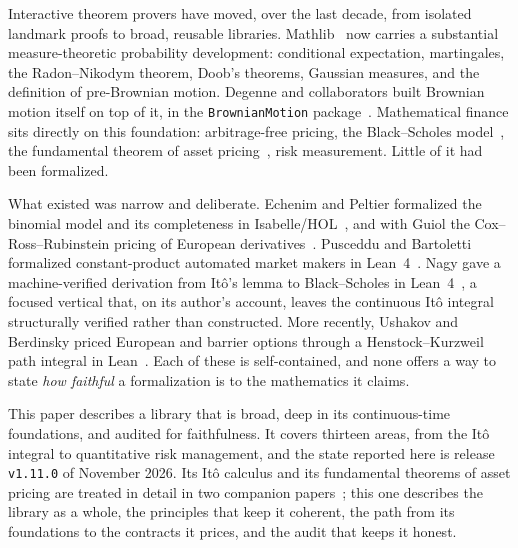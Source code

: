 \documentclass[11pt]{article}
\begin{document}
Interactive theorem provers have moved, over the last decade, from isolated landmark proofs to broad, reusable
libraries. Mathlib~\cite{Mathlib2020} now carries a substantial measure-theoretic probability development:
conditional expectation, martingales, the Radon--Nikodym theorem, Doob's theorems, Gaussian measures, and the
definition of pre-Brownian motion. Degenne and collaborators built Brownian motion itself on top of it,
in the \texttt{BrownianMotion} package~\cite{DegenneEtAl2025,BrownianMotionRepo}. Mathematical finance sits directly on this foundation: arbitrage-free pricing,
the Black--Scholes model~\cite{BlackScholes1973}, the fundamental theorem of asset
pricing~\cite{HarrisonKreps1979}, risk measurement. Little of it had been formalized.

What existed was narrow and deliberate. Echenim and Peltier formalized the binomial model and its completeness
in Isabelle/HOL~\cite{EchenimPeltier2017}, and with Guiol the Cox--Ross--Rubinstein pricing of European
derivatives~\cite{EchenimGuiolPeltier2020}. Pusceddu and Bartoletti formalized constant-product automated market
makers in Lean~4~\cite{PuscedduBartoletti2024}. Nagy gave a machine-verified derivation from It\^o's lemma to
Black--Scholes in Lean~4~\cite{Nagy2026}, a focused vertical that, on its author's account, leaves the continuous
It\^o integral structurally verified rather than constructed. More recently, Ushakov and Berdinsky priced European
and barrier options through a Henstock--Kurzweil path integral in Lean~\cite{UshakovBerdinsky2026}. Each of these
is self-contained, and none offers a way to state \emph{how faithful} a formalization is to the mathematics it
claims.

This paper describes a library that is broad, deep in its continuous-time foundations, and audited for
faithfulness. It covers thirteen areas, from the It\^o integral to quantitative risk management, and the state
reported here is release \texttt{v1.11.0} of November 2026. Its It\^o calculus and its fundamental theorems of asset
pricing are treated in detail in two companion papers~\cite{CoelhoIto,CoelhoFTAP}; this one describes the
library as a whole, the principles that keep it coherent, the path from its foundations to the contracts it
prices, and the audit that keeps it honest.
\end{document}
